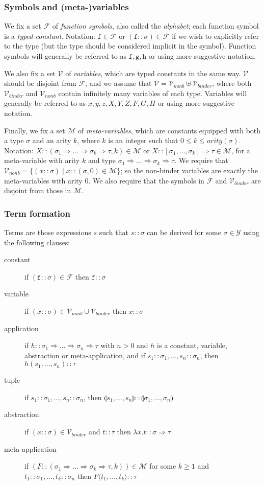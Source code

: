 \documentclass{lmcs}
\theoremstyle{theorem}\newtheorem{theorem}{Theorem}
\theoremstyle{theorem}\newtheorem{lemma}[theorem]{Lemma}
\theoremstyle{theorem}\newtheorem{corollary}[theorem]{Corollary}
\theoremstyle{definition}\newtheorem{definition}[theorem]{Definition}
\theoremstyle{definition}\newtheorem{example}[theorem]{Example}
\newcommand{\F}{\mathcal{F}}
\newcommand{\V}{\mathcal{V}}
\newcommand{\M}{\mathcal{M}}
\newcommand{\Vfree}{\mathcal{V}_{\mathit{nonb}}}
\newcommand{\Vbound}{\mathcal{V}_{\mathit{binder}}}
\newcommand{\Types}{\mathcal{Y}}
\newcommand{\atype}{\sigma}
\newcommand{\btype}{\tau}
\newcommand{\identifier}[1]{\mathtt{#1}}
\newcommand{\afun}{\identifier{f}}
\newcommand{\bfun}{\identifier{g}}
\newcommand{\cfun}{\identifier{h}}
\newcommand{\avar}{x}
\newcommand{\bvar}{y}
\newcommand{\cvar}{z}
\newcommand{\Avar}{X}
\newcommand{\Bvar}{Y}
\newcommand{\Cvar}{Z}
\newcommand{\AFvar}{F}
\newcommand{\BFvar}{G}
\newcommand{\CFvar}{H}
\newcommand{\ameta}{F}
\newcommand{\abs}[2]{\lambda #1.#2}
\newcommand{\meta}[2]{#1\langle#2\rangle}
\newcommand{\tuple}[2]{\llparenthesis #1,\dots,#2 \rrparenthesis}
\newcommand{\product}[2]{\llparenthesis #1,\dots,#2 \rrparenthesis}
\newcommand{\arity}{\mathit{arity}}
\newcommand{\arrtype}{\Rightarrow}
\newcommand{\mysubsection}[1]{\vspace{-12pt}\subsubsection{#1}}
\begin{document}
\mysubsection{Symbols and (meta-)variables}

We fix a set $\F$ of \emph{function symbols}, also called the \emph{alphabet};
each function symbol is a \emph{typed constant}. Notation: $\afun \in \F$ or
$(\afun :: \atype) \in \F$ if we wish to explicitly refer to the type (but the
type should be considered implicit in the symbol).
Function symbols will generally be referred to as $\afun,\bfun,\cfun$ or using
more suggestive notation.

We also fix a set $\V$ of \emph{variables}, which are typed constants in the
same way.  $\V$ should be disjoint from $\F$, and we assume that $\V = \Vfree
\uplus \Vbound$, where both $\Vbound$ and $\Vfree$ contain infinitely many
variables of each type.
Variables will generally be referred to as $\avar,\bvar,\cvar,\Avar,\Bvar,\Cvar,
\AFvar,\BFvar,\CFvar$ or using more suggestive notation.

Finally, we fix a set $\M$ of \emph{meta-variables}, which are constants
equipped with both a type $\atype$ and an arity $k$, where $k$ is an integer
such that $0 \leq k \leq \arity(\atype)$.  Notation:
$X :: (\atype_1 \arrtype \dots \arrtype \atype_k \arrtype \btype,k) \in \M$ or
$X :: [\atype_1,\dots,\atype_k] \arrtype \btype \in \M$, for a meta-variable
with arity $k$ and type $\atype_1 \arrtype \dots \arrtype \atype_k \arrtype
\btype$.  We require that $\Vfree = \{ (x :: \atype) \mid x :: (\atype,0) \in
\M \}$; so the non-binder variables are exactly the meta-variables with arity
$0$.  We also require that the symbols in $\F$ and $\Vbound$ are disjoint from
those in $\M$.

\mysubsection{Term formation}\label{subsec:form}

Terms are those expressions $s$ such that $s :: \atype$ can be derived for some
$\atype \in \Types$ using the following clauses:

\begin{description}
\item[constant] if $(\afun :: \atype) \in \F$ then $\afun :: \atype$
\item[variable] if $(\avar :: \atype) \in \Vfree \cup \Vbound$ then $\avar ::
  \atype$
\item[application] if $h :: \atype_1 \arrtype \dots \arrtype \atype_n \arrtype
  \btype$ with $n > 0$ and $h$ is a constant, variable, abstraction or
  meta-application, and if $s_1 :: \atype_1,\dots,s_n :: \atype_n$,
  then $h(s_1,\dots,s_n) :: \btype$
\item[tuple] if $s_1 :: \atype_1,\dots,s_n :: \atype_n$, then
  $\tuple{s_1}{s_n} :: \product{\atype_1}{\atype_n}$
\item[abstraction] if $(\avar :: \atype) \in \Vbound$ and $t :: \btype$ then
  $\abs{\avar}{t} :: \atype \arrtype \btype$
\item[meta-application] if $(\ameta :: (\atype_1 \arrtype \dots \arrtype
  \atype_k \arrtype \btype,k)) \in \M$ for some $k \geq 1$ and $t_1 :: \atype_1,
  \dots,t_k :: \atype_n$ then $\meta{\ameta}{t_1,\dots,t_k} :: \btype$
\end{description}
\end{document}
